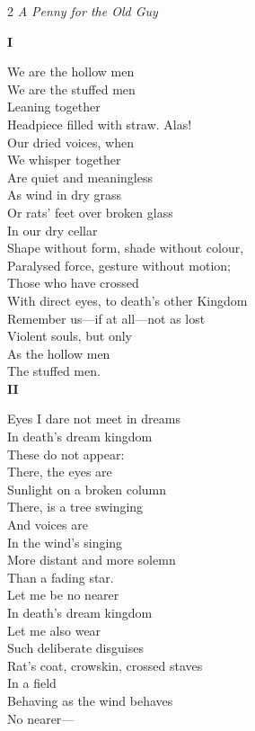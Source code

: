 \documentclass[10pt,a4paper]{article}
\begin{document}
\begin{multicols}{2}
\hspace{2cm}\emph{A Penny for the Old Guy}

\hbox{}\hspace{1cm}\linenumbers \textbf{I}

We are the hollow men\\
We are the stuffed men\\
Leaning together\\
Headpiece filled with straw. Alas!\\
Our dried voices, when\\
We whisper together\\
Are quiet and meaningless\\
As wind in dry grass\\
Or rats’ feet over broken glass\\
In our dry cellar\\

Shape without form, shade without colour,\\
Paralysed force, gesture without motion;\\

Those who have crossed\\
With direct eyes, to death’s other Kingdom\\
Remember us—if at all—not as lost\\
Violent souls, but only\\
As the hollow men\\
The stuffed men.\\

\hspace{1cm}\textbf{II}

Eyes I dare not meet in dreams\\
In death’s dream kingdom\\
These do not appear:\\
There, the eyes are\\
Sunlight on a broken column\\
There, is a tree swinging\\
And voices are\\
In the wind’s singing\\
More distant and more solemn\\
Than a fading star.\\

Let me be no nearer\\
In death’s dream kingdom\\
Let me also wear\\
Such deliberate disguises\\
Rat’s coat, crowskin, crossed staves\\
In a field\\
Behaving as the wind behaves\\
No nearer—\\


\end{multicols}
\end{document}
